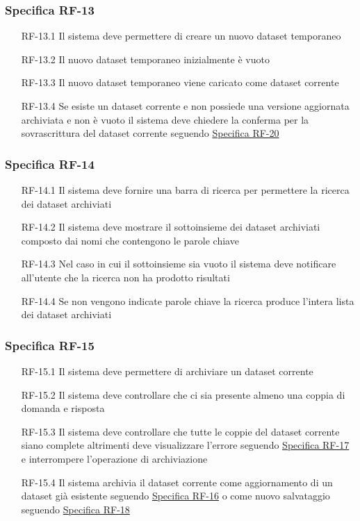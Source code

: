 \subsubsection{Specifica RF-13}
\label{subsubsec:RF-13}
\begin{enumerate}
    \item[RF-13.1] Il sistema deve permettere di creare un nuovo dataset temporaneo
    \item[RF-13.2] Il nuovo dataset temporaneo inizialmente è vuoto
    \item[RF-13.3] Il nuovo dataset temporaneo viene caricato come dataset corrente
    \item[RF-13.4] Se esiste un dataset corrente e non possiede una versione aggiornata archiviata e non è vuoto il sistema deve chiedere
    la conferma per la sovrascrittura del dataset corrente seguendo \hyperref[subsubsec:RF-20]{Specifica RF-20}
\end{enumerate}

\subsubsection{Specifica RF-14}
\label{subsubsec:RF-14}
\begin{enumerate}
    \item[RF-14.1] Il sistema deve fornire una barra di ricerca per permettere la ricerca dei dataset archiviati
    \item[RF-14.2] Il sistema deve mostrare il sottoinsieme dei dataset archiviati composto dai nomi che contengono le parole chiave
    \item[RF-14.3] Nel caso in cui il sottoinsieme sia vuoto il sistema deve notificare all'utente che la ricerca non ha prodotto risultati
    \item[RF-14.4] Se non vengono indicate parole chiave la ricerca produce l'intera lista dei dataset archiviati
\end{enumerate}


\subsubsection{Specifica RF-15}
\label{subsubsec:RF-15}
\begin{enumerate}
    \item[RF-15.1] Il sistema deve permettere di archiviare un dataset corrente
    \item[RF-15.2] Il sistema deve controllare che ci sia presente almeno una coppia di domanda e risposta
    \item[RF-15.3] Il sistema deve controllare che tutte le coppie del dataset corrente siano complete altrimenti deve visualizzare l'errore seguendo \hyperref[subsubsec:RF-17]{Specifica RF-17} e interrompere l'operazione di archiviazione
    \item[RF-15.4] Il sistema archivia il dataset corrente come aggiornamento di un dataset già esistente seguendo \hyperref[subsubsec:RF-16]{Specifica RF-16}
    o come nuovo salvataggio seguendo \hyperref[subsubsec:RF-18]{Specifica RF-18}
\end{enumerate}

